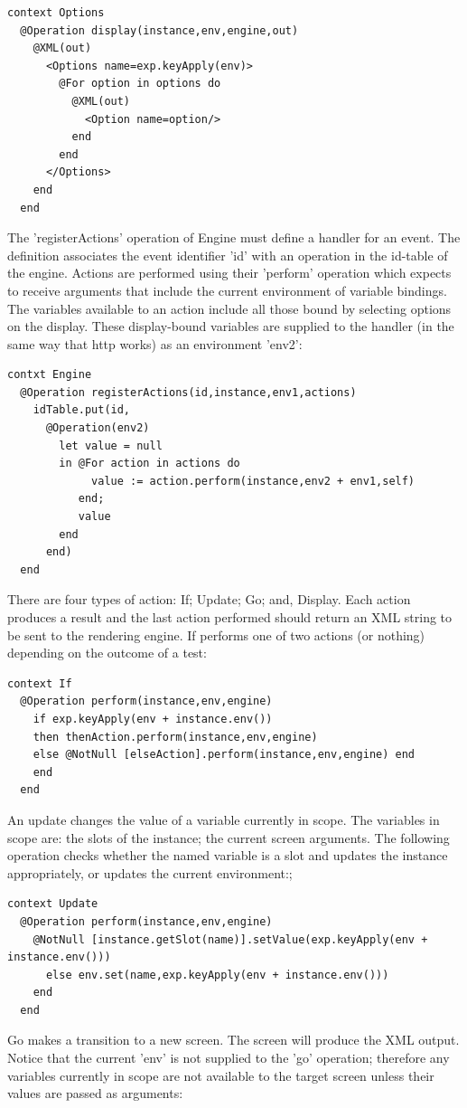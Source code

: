 \begin{lstlisting}
context Options
  @Operation display(instance,env,engine,out)
    @XML(out)
      <Options name=exp.keyApply(env)>
        @For option in options do
          @XML(out)
            <Option name=option/>
          end
        end
      </Options>
    end
  end
\end{lstlisting}The 'registerActions' operation of Engine must define a handler for
an event. The definition associates the event identifier 'id' with
an operation in the id-table of the engine. Actions are performed
using their 'perform' operation which expects to receive arguments
that include the current environment of variable bindings. The variables
available to an action include all those bound by selecting options
on the display. These display-bound variables are supplied to the
handler (in the same way that http works) as an environment 'env2':

\begin{lstlisting}
contxt Engine
  @Operation registerActions(id,instance,env1,actions)
    idTable.put(id,
      @Operation(env2)
        let value = null
        in @For action in actions do
             value := action.perform(instance,env2 + env1,self)
           end;
           value
        end
      end)
  end
\end{lstlisting}There are four types of action: If; Update; Go; and, Display. Each
action produces a result and the last action performed should return
an XML string to be sent to the rendering engine. If performs one
of two actions (or nothing) depending on the outcome of a test:

\begin{lstlisting}
context If
  @Operation perform(instance,env,engine)
    if exp.keyApply(env + instance.env())
    then thenAction.perform(instance,env,engine)
    else @NotNull [elseAction].perform(instance,env,engine) end
    end
  end
\end{lstlisting}An update changes the value of a variable currently in scope. The
variables in scope are: the slots of the instance; the current screen
arguments. The following operation checks whether the named variable
is a slot and updates the instance appropriately, or updates the current
environment:;

\begin{lstlisting}
context Update
  @Operation perform(instance,env,engine)
    @NotNull [instance.getSlot(name)].setValue(exp.keyApply(env + instance.env()))
      else env.set(name,exp.keyApply(env + instance.env()))
    end
  end
\end{lstlisting}Go makes a transition to a new screen. The screen will produce the
XML output. Notice that the current 'env' is not supplied to the 'go'
operation; therefore any variables currently in scope are not available
to the target screen unless their values are passed as arguments:

